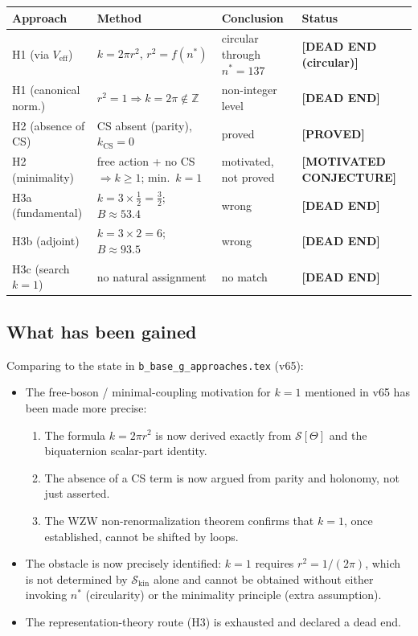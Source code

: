 \documentclass[11pt,a4paper]{article}
\theoremstyle{definition}
\theoremstyle{remark}
\begin{document}
\begin{center}
\begin{tabular}{llll}
  \toprule
  Approach & Method & Conclusion & Status \\
  \midrule
  H1 (via $V_{\mathrm{eff}}$) & $k = 2\pi r^2$, $r^2 = f(n^*)$ & circular through $n^*=137$ & \textbf{[DEAD END (circular)]} \\
  H1 (canonical norm.)  & $r^2 = 1 \Rightarrow k = 2\pi \notin \mathbb{Z}$ & non-integer level & \textbf{[DEAD END]} \\
  H2 (absence of CS)    & CS absent (parity), $k_{\mathrm{CS}}=0$ & proved & \textbf{[PROVED]} \\
  H2 (minimality)       & free action + no CS $\Rightarrow k \geq 1$; min.\ $k=1$ & motivated, not proved & \textbf{[MOTIVATED CONJECTURE]} \\
  H3a (fundamental)     & $k = 3 \times \tfrac{1}{2} = \tfrac{3}{2}$; $B \approx 53.4$ & wrong & \textbf{[DEAD END]} \\
  H3b (adjoint)         & $k = 3 \times 2 = 6$; $B \approx 93.5$ & wrong & \textbf{[DEAD END]} \\
  H3c (search $k=1$)    & no natural assignment & no match & \textbf{[DEAD END]} \\
  \bottomrule
\end{tabular}
\end{center}

\subsection{What has been gained}

Comparing to the state in \texttt{b\_base\_g\_approaches.tex} (v65):
\begin{itemize}
  \item The free-boson / minimal-coupling motivation for $k=1$
    mentioned in v65 has been made more precise:
    \begin{enumerate}
      \item The formula $k = 2\pi r^2$ is now derived exactly from
        $\mathcal{S}[\Theta]$ and the biquaternion scalar-part identity.
      \item The absence of a CS term is now argued from parity and
        holonomy, not just asserted.
      \item The WZW non-renormalization theorem confirms that $k=1$, once
        established, cannot be shifted by loops.
    \end{enumerate}
  \item The obstacle is now precisely identified: $k=1$ requires
    $r^2 = 1/(2\pi)$, which is not determined by
    $\mathcal{S}_{\mathrm{kin}}$ alone and cannot be obtained without
    either invoking $n^*$ (circularity) or the minimality principle
    (extra assumption).
  \item The representation-theory route (H3) is exhausted and declared
    a dead end.
\end{itemize}
\end{document}

